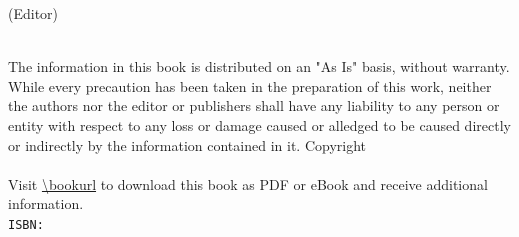 \thispagestyle{empty}
\booktitle
\newpage
\newpage
\begin{titlepage}
\begin{flushright}
\bookeditor{} (Editor)\\
\vspace{10em}
{\Huge\bfseries\sffamily\booktitle}\\
\vspace{2em}
{\large\sffamily\booksubtitle}
\end{flushright}
\end{titlepage}
\thispagestyle{empty}
The information in this book is distributed on an "As Is" basis, without warranty. While every precaution has been taken in the preparation of this work, neither the authors nor the editor or publishers shall have any liability to any person or entity with respect to any loss or damage caused or alledged to be caused directly or indirectly by the information contained in it.%
\vfill
Copyright \textcopyright{} \bookyear{} \bookauthors\\
\newline
{}
\newline \\
Visit \url{\bookurl} to download this book as PDF or eBook and receive additional information.
\newline \\
{\tt ISBN: \bookisbn}%
